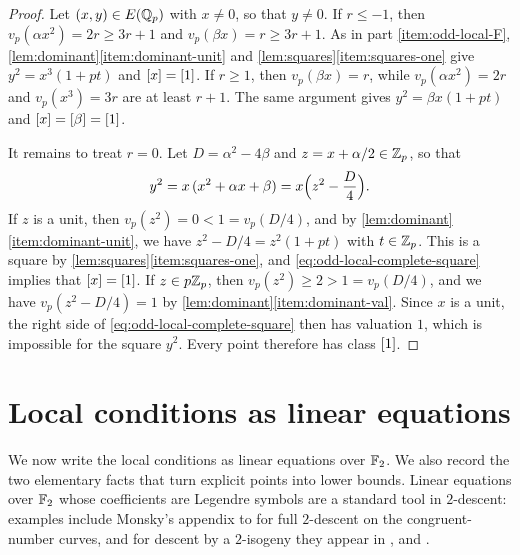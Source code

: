 \begin{proof}
Let $(x,y)\in E(\mathbb Q_p)$ with $x\ne0$, so that $y\ne0$. If $r\le-1$, then $v_p(\alpha x^2)=2r\ge3r+1$ and $v_p(\beta x)=r\ge3r+1$. As in part \ref{item:odd-local-F}, \cref{lem:dominant}\ref{item:dominant-unit} and \cref{lem:squares}\ref{item:squares-one} give $y^2=x^3(1+pt)$ and $[x]=[1]$. If $r\ge1$, then $v_p(\beta x)=r$, while $v_p(\alpha x^2)=2r$ and $v_p(x^3)=3r$ are at least $r+1$. The same argument gives $y^2=\beta x(1+pt)$ and $[x]=[\beta]=[1]$.

It remains to treat $r=0$. Let $D=\alpha^2-4\beta$ and $z=x+\alpha/2\in\mathbb Z_p$, so that
\begin{equation}\label{eq:odd-local-complete-square}
y^2=x\,(x^2+\alpha x+\beta)=x\Bigl(z^2-\frac D4\Bigr).
\end{equation}
If $z$ is a unit, then $v_p(z^2)=0<1=v_p(D/4)$, and by \cref{lem:dominant}\ref{item:dominant-unit}, we have $z^2-D/4=z^2(1+pt)$ with $t\in\mathbb Z_p$. This is a square by \cref{lem:squares}\ref{item:squares-one}, and \eqref{eq:odd-local-complete-square} implies that $[x]=[1]$. If $z\in p\mathbb Z_p$, then $v_p(z^2)\ge2>1=v_p(D/4)$, and we have $v_p(z^2-D/4)=1$ by \cref{lem:dominant}\ref{item:dominant-val}. Since $x$ is a unit, the right side of \eqref{eq:odd-local-complete-square} then has valuation $1$, which is impossible for the square $y^2$. Every point therefore has class $[1]$.
\end{proof}

\section{Local conditions as linear equations}\label{sec:descent-linear}

We now write the local conditions as linear equations over $\mathbb F_2$. We also record the two elementary facts that turn explicit points into lower bounds. Linear equations over $\mathbb F_2$ whose coefficients are Legendre symbols are a standard tool in $2$-descent: examples include Monsky's appendix to \cite[pp.~365--369, especially p.~366]{HeathBrownMonsky1994} for full $2$-descent on the congruent-number curves, and for descent by a $2$-isogeny they appear in \cite[Sections~2--3]{Feng1996}, \cite[Section~3.1, Theorem~3]{XiongZaharescu2009} and \cite[Section~4]{KaneKlagsbrun2017}.


